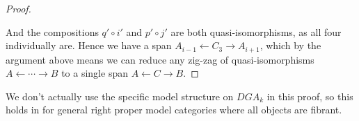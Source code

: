 \begin{proof}
\begin{center}
\end{center}

And the compositions $q'\circ i'$ and $p'\circ j'$ are both quasi-isomorphisms, as all four individually are. Hence we have a span $A_{i-1}\longleftarrow C_3 \longrightarrow A_{i+1}$, which by the argument above means we can reduce any zig-zag of quasi-isomorphisms $A\leftarrow \cdots \rightarrow B$ to a single span $A\leftarrow C\rightarrow B$. 
\end{proof}





We don't actually use the specific model structure on $DGA_k$ in this proof, so this holds in for general right proper model categories where all objects are fibrant. 

